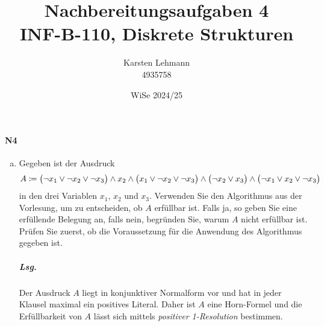 \documentclass{scrreprt}
\author{Karsten Lehmann \\ 4935758}
\date{WiSe 2024/25}
\title{Nachbereitungsaufgaben 4\\INF-B-110, Diskrete Strukturen}
\begin{document}
\paragraph{N4}
\begin{enumerate}[(a)]
\item Gegeben ist der Ausdruck
  \[
    A \coloneqq \qty\big(\neg x_1 \lor \neg x_2 \lor \neg x_3) \land
    x_2 \land
    \qty\big(x_1 \lor \neg x_2 \lor \neg x_3) \land
    \qty\big(\neg x_2 \lor x_3) \land
    \qty\big(\neg x_1 \lor x_2 \lor \neg x_3)
  \]
  in den drei Variablen $x_1$, $x_2$ und $x_3$.
  Verwenden Sie den Algorithmus aus der Vorlesung, um zu entscheiden, ob $A$
  erfüllbar ist.
  Falls ja, so geben Sie eine erfüllende Belegung an, falls nein, begründen Sie,
  warum $A$ nicht erfüllbar ist.
  Prüfen Sie zuerst, ob die Voraussetzung für die Anwendung des Algorithmus
  gegeben ist.

  \subparagraph{Lsg.} Der Ausdruck $A$ liegt in konjunktiver Normalform vor und
  hat in jeder Klausel maximal ein positives Literal.
  Daher ist $A$ eine Horn-Formel und die Erfüllbarkeit von $A$ lässt sich mittels
  \emph{positiver 1-Resolution} bestimmen.


\end{enumerate}
\end{document}
